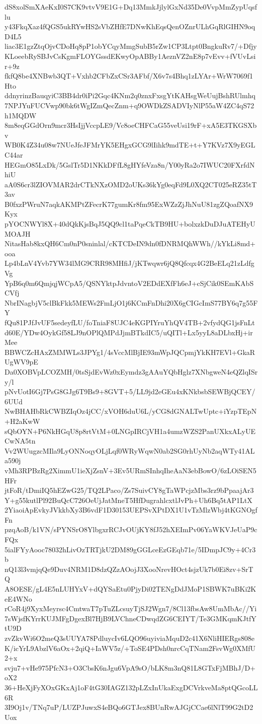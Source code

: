 dS8xolSmXAeKxI0S7CK9vtvV9E1G+Dq13MmkJjlylGxNd35De0VvpMmZypUqsflu
y43FkqXaz4fQGS5ukRYwHS2sVbZHfE7DNwKhEqsQenOZnrULhGqRlGIHN9oqD4L5
liac3E1gzZtqOjvCDoHq8pP1obYCqyMmgSubB5rZw1CP3Ltpt0BngkuRv7/+Dfjy
KLoeebRySBJvCsKgmFLOYGssdEKwyOpABBy1AeznVZ2nE8p7vEvv+fVUvLsir+9z
fkfQ8be4XNBwb3QT+Vxhb2CFbZxCSr3AFbf/X6v7s4Bhq1zLYAr+WrW7069f1Hto
ddnyrinzBauqyiC3BB4dr0iPi2Gqc4KNm2q0znxFxsgYtKAHsgWeUujBshRUlmhq
7NPJYuFUCVwp90bk6tWgIZmQecZnm+q9OWDkZSADVIyNlP55aW4ZC4qS72h1MQDW
8m8eqGGdOrn9mcr3HsIjjVccpLE9/Vc8oeCHFCaG55veUsi19rF+xA5E3TKGSXbv
WB0K4Z34u08w7NUeJfeJFMrYK5EHgxGCG9lIihk9mdTE+t+Y7KVz7X9yEGLC44ar
HEGmO85LxDk/5GslTr5D1NKkDFfL8gHYfeVza8n/Y00yRa2o7IWUC20FXrfdNhiU
aA0S6cr3lZIOVMAR2drCTkNXzOMD2oUKs36kYg0eqFd9L0XQ2CT025eRZ35tT3av
B0fxzPWruN7aqkAKMPtZFecrK77gumKr8fm95ExWZzZjJhNuU81zgZQoafNX9Kyx
pYOCNWYl8X+40dQkKjsBqJ5QQ9cl1taPqeCkTB9HU+bolxzkDuDJuATEHyUMOAJH
NitasHab8kxQH6Cm0nP0sninlal/cKTCDeIN9dn0fDNRMQhWWh//kYkLi8md+ooa
Lp4bLnV4Yvb7YW34lMG9CRR98MHfiJ/jKTwqwr6jQ8Qfcqx4G2BeELq21zLdfgVg
YpB6q0m6QmjqjWCpA5/QSNYktpJdvntoV2EDdEXfFh6eJ+cSjCik0SEmKAbSCVfj
NbrINagbjV5clBkFkk5MEWs2FmLjO1j6KCmFnDhi20X6gCIGcImS77BY6q7g55FY
fQu81PJfJvUF5sedeyfLU/foTniaF8UJC4eKGPIYruYhQV4TB+2vfydQG1jsFnLt
d60E/YDw4OykGf58LJ9nOPlQMPdJjmBTkdIC5/uQITl+Lx5yyL8aDLbxHj+irMee
BBWCZcHAxZMMWLs3JPYg1/4sVccMlBjIE93mWpJQCpmjYkKH7EVl+GkaRUgWV9pE
Da0XOBVpLCOZMH/0tsSjdEvWz0xEymdz3gAAuYQbHglz7XNbgweN4eQZlqISry/l
pNvUotI6Gj7PsG8GJg6T9Bs9+8GVT+5/LL9jd2eGEu4xKNkbsbSEWBjQCEY/6UUd
NwBHAHbRkCWBZIqOz4jCC/xVOH6duU6L/yCG8dGNALTwUptc+iYzpTEpN+H2aKwW
sQbOYN+P6NkHGqU8p8rtVtM+0LNGpIRCjVH1a4umzWZS2PanUXkxALyUECwNA5tn
Vv2WUugzcMIla9LyONNoqyOLjLqf0WRyWqwN0ab2SG0rhUyNb2aqWTy41ALa590j
vMh3RPBzRg2XimmU1ieXjZsnV+3Ev5URmSInhqIheAaN3ebBowO/6zLOiSEN5HFr
jtFoR/tDmiIQ5hEZwG25/TQ2LPaco/Zs7SuivCY8gTaWPcjzMbs3rz9bPpaajAr3
Y+g55kutlPl92BuQcC726OeUjJatMneT5HfDugrahlcxtlJvPh+Uh6Bq5tAP1LtX
2YiaoiApEvkyJVkkbXy3B6vdF1D30153UEPSvXPtDX1U1vTzMlzWbj4tKGNOgfFn
pzqAoB/k1VN/sPYNSrO8YlbgxrRCJvOUjKY8fJ52hXEImPv06YaWKVJeUaP9cFQx
5ialFYyAooc78032hLivOzTRTjkU2DM89gGGLceEzGEqb71e/5IDmpJC9y+4Cr3b
nQ13l3vmjqQe9Duv4NRM1D8dzQZzAOojJ3XooNrevHOct4sjzUk7b0Ei8zv+SrTQ
A8OESE/gL4E5nLUHYxV+dQYSaEtu0PjyDi02TENgDdJMoP1SBWK7uBKi2KeE4WNo
rCoR4j9XyxMeyrsc4CmtwaT7pTuZLcsuyTjSJ2Wgn7/8Cl13fbsAw8UmMbAc//Yi
7sWjsfKYrrKUJMFgDgexBl7HjB9LVChneCDwqdZG6CEIYT/Te3GMKqmKJtfYtU9D
zvZkvWi6O2meQ3sUUYA78PdluycIv6LQO96uyiviaMquD2c41X6NliHIERgs808e
K/icYrL9AbzlV6aOx+2qiQ+IaWV5z/+ToSE4PDsh0nrcCqTNam2FsvWg0XMfU2+x
svju7+vHe975PfcN3+O3CbsK6nJgu6VpA9sO/bLK8m3nQ81L8GTxFjMBhJ/D+oX2
36+HeXjFyXOxGKxAj1oF4tG30IAGZ132pLZxInUkaExgDCVrkveMa8ptQGcoLL6R
3I9Oj1v/TNq7uP/LUZPJuwxS4eBQo6GTJex8BUnRwAJGjCCae6lNlT99G2tD2Uox
